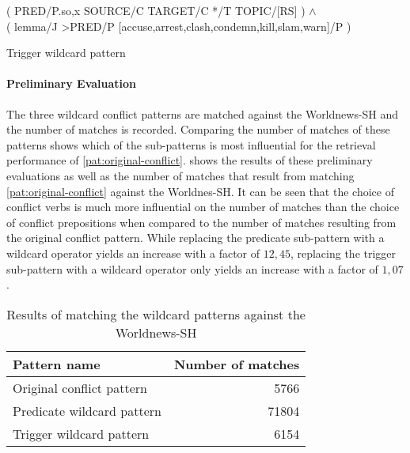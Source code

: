 \documentclass[11pt]{scrreprt}
\begin{document}
\begin{pattern}
  \normalfont\sffamily
  \centering
  ( PRED/P.{so,x} SOURCE/C TARGET/C */T TOPIC/[RS] ) \(\wedge\) \\  ( lemma/J >PRED/P [accuse,arrest,clash,condemn,kill,slam,warn]/P )
  \caption{Trigger wildcard pattern}
  \label{pat:wildcard-prep}
\end{pattern}


\paragraph{Preliminary Evaluation}
The three wildcard conflict patterns are matched against the Worldnews-SH and the number of matches is recorded. Comparing the number of matches of these patterns shows which of the sub-patterns is most influential for the retrieval performance of \cref{pat:original-conflict}.  shows the results of these preliminary evaluations as well as the number of matches that result from matching \cref{pat:original-conflict} against the Worldnes-SH. It can be seen that the choice of conflict verbs is much more influential on the number of matches than the choice of conflict prepositions when compared to the number of matches resulting from the original conflict pattern. While replacing the predicate sub-pattern with a wildcard operator yields an increase with a factor of \(12,45\), replacing the trigger sub-pattern with a wildcard operator only yields an increase with a factor of \(1,07\). 


\begin{table}[h]
\centering
\begin{tabular}{lr}
\toprule
\multicolumn{1}{l}{Pattern name}				& \multicolumn{1}{l}{Number of matches} \\
\midrule
Original conflict pattern					& 5766	\\
Predicate wildcard pattern					& 71804 \\
Trigger wildcard pattern						& 6154	\\
\bottomrule
\end{tabular}
\caption{Results of matching the wildcard patterns against the Worldnews-SH}
\label{tab:wildcard-pattern-evaluation}
\end{table}
\end{document}
